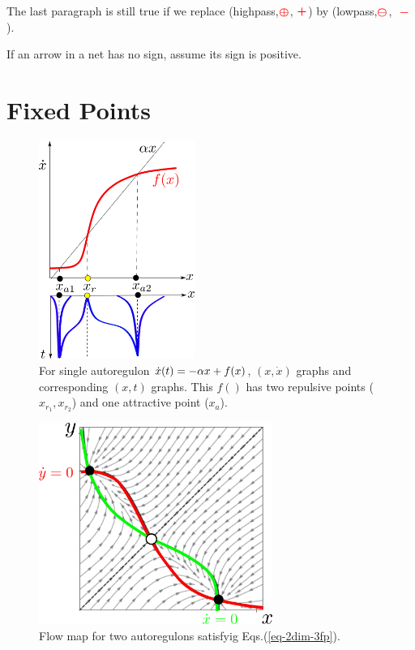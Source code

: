 The last paragraph is still true if we replace (highpass,${\color{red}\bm\oplus}$, 
${\color{red}\bm +}$) by 
(lowpass,${\color{red}\bm\ominus}$, 
${\color{red}\bm{\;-\;}}$).

If an arrow in a net has no sign, assume its sign is positive.



\section{Fixed Points}

\begin{figure}[h!]
\centering
\includegraphics[width=2in]
{autoregulons/source-sink-source.png}
\caption{For single autoregulon $\dot{x}(t)=-\alpha x + f(x)$, $(x, \dot{x})$ graphs and 
corresponding $(x,t)$ graphs. This $f()$ has
two repulsive  points ($x_{r_1}, x_{r_2}$) 
and one attractive  point ($x_a$).
}
\label{fig-source-sink-source}
\end{figure}

\begin{figure}[h!]
\centering
\includegraphics[width=3in]
{autoregulons/2dim-3fp.png}
\caption{Flow map for two autoregulons satisfyig Eqs.(\ref{eq-2dim-3fp}).}
\label{fig-2dim-3fp}
\end{figure}

